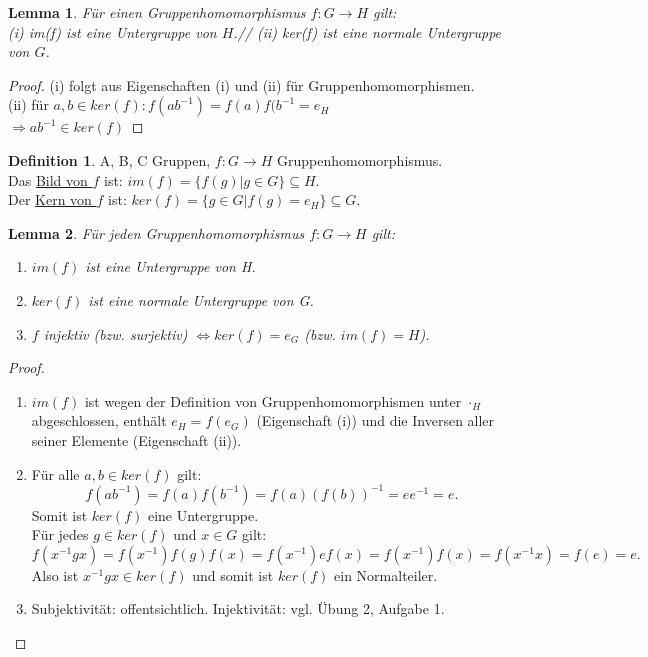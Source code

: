 \documentclass[12pt]{scrartcl}%
\newtheorem{lemma}{Lemma}
\theoremstyle{definition}
\newtheorem*{defn}{Definition}
\theoremstyle{remark}
\begin{document}
\begin{lemma}
Für einen Gruppenhomomorphismus $f: G \rightarrow H$ gilt:\\
(i) im(f) ist eine Untergruppe von $H$.//
(ii) ker(f) ist eine normale Untergruppe von $G$.
\end{lemma}

\begin{proof}
(i) folgt aus Eigenschaften (i) und (ii) für Gruppenhomomorphismen.\\
(ii) für $a,b \in ker(f): f(ab^{-1})=f(a)f(b^{-1}=e_H$\\
$\Rightarrow ab^{-1} \in ker(f)$
\end{proof}

\begin{defn}
	A, B, C Gruppen, $ f: G \rightarrow H$ Gruppenhomomorphismus. \\
	Das \underline{Bild von $f$} ist: $im(f) = \{f(g) | g \in G\} \subseteq H$. \\
	Der \underline{Kern von $f$} ist: $ker(f) = \{g \in G | f(g) = e_H\} \subseteq G$.
\end{defn}

\begin{lemma}
	Für jeden Gruppenhomomorphismus $ f: G \rightarrow H$ gilt:
	\begin{enumerate}[label=(\roman*)]
		\item $im(f)$ ist eine Untergruppe von H.
		\item $ker(f)$ ist eine normale Untergruppe von G.
		\item $f$ injektiv (bzw. surjektiv) $ \Leftrightarrow ker(f) = {e_G}$ (bzw. $im(f) = H$).
	\end{enumerate}
\end{lemma}

\begin{proof}
	\begin{enumerate}[label=(\roman*)]
		\item $im(f)$ ist wegen der Definition von Gruppenhomomorphismen unter $\cdot_H$ abgeschlossen, enthält $e_H = f(e_G)$ (Eigenschaft (i)) und die Inversen aller seiner Elemente (Eigenschaft (ii)).
		\item Für alle $a, b \in ker(f)$ gilt:
			$$ f(ab^{-1}) = f(a)f(b^{-1}) = f(a)(f(b))^{-1} = ee^{-1} = e.$$
			Somit ist $ker(f)$ eine Untergruppe. \\
			Für jedes $ g \in ker(f)$ und $x \in G$ gilt:
			$$ f(x^{-1}gx) = f(x^{-1})f(g)f(x) = f(x^{-1}) e f(x) = f(x^{-1})f(x) = f(x^{-1}x) = f(e) = e.$$
			Also ist $x^{-1}gx \in ker(f) $ und somit ist $ker(f)$ ein Normalteiler.
		\item Subjektivität: offentsichtlich. Injektivität: vgl. Übung 2, Aufgabe 1.
	\end{enumerate}	
\end{proof}
\end{document}
